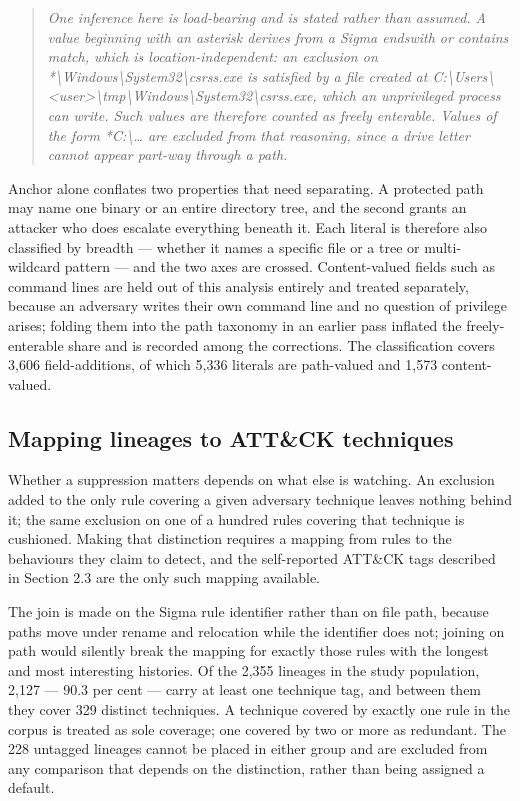 \begin{quote}\itshape
One inference here is load-bearing and is stated rather than assumed. A value beginning with an asterisk derives from a Sigma endswith or contains match, which is location-independent: an exclusion on *\textbackslash{}Windows\textbackslash{}System32\textbackslash{}csrss.exe is satisfied by a file created at C:\textbackslash{}Users\textbackslash{}<user>\textbackslash{}tmp\textbackslash{}Windows\textbackslash{}System32\textbackslash{}csrss.exe, which an unprivileged process can write. Such values are therefore counted as freely enterable. Values of the form *C:\textbackslash{}\dots{} are excluded from that reasoning, since a drive letter cannot appear part-way through a path.
\end{quote}

Anchor alone conflates two properties that need separating. A protected path may name one binary or an entire directory tree, and the second grants an attacker who does escalate everything beneath it. Each literal is therefore also classified by breadth --- whether it names a specific file or a tree or multi-wildcard pattern --- and the two axes are crossed. Content-valued fields such as command lines are held out of this analysis entirely and treated separately, because an adversary writes their own command line and no question of privilege arises; folding them into the path taxonomy in an earlier pass inflated the freely-enterable share and is recorded among the corrections. The classification covers 3,606 field-additions, of which 5,336 literals are path-valued and 1,573 content-valued.

\subsection{Mapping lineages to ATT\&CK techniques}
\label{sec:attack}

Whether a suppression matters depends on what else is watching. An exclusion added to the only rule covering a given adversary technique leaves nothing behind it; the same exclusion on one of a hundred rules covering that technique is cushioned. Making that distinction requires a mapping from rules to the behaviours they claim to detect, and the self-reported ATT\&CK tags described in Section 2.3 are the only such mapping available.

The join is made on the Sigma rule identifier rather than on file path, because paths move under rename and relocation while the identifier does not; joining on path would silently break the mapping for exactly those rules with the longest and most interesting histories. Of the 2,355 lineages in the study population, 2,127 --- 90.3 per cent --- carry at least one technique tag, and between them they cover 329 distinct techniques. A technique covered by exactly one rule in the corpus is treated as sole coverage; one covered by two or more as redundant. The 228 untagged lineages cannot be placed in either group and are excluded from any comparison that depends on the distinction, rather than being assigned a default.

